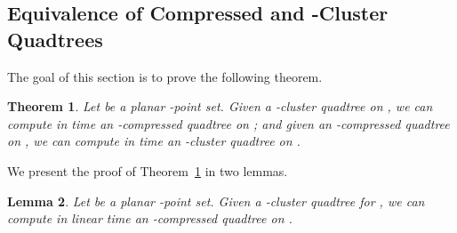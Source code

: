\documentclass[11pt]{paper}
\newtheorem {theorem} {Theorem}[section]
\newtheorem {lem}[theorem] {Lemma}
\begin{document}
\subsection{Equivalence of Compressed and -Cluster Quadtrees}
\label{sec:compressed-c-cluster}

    The goal of this section is to prove the following theorem.
    \begin{theorem}\label{thm:cluster-compressed-equiv}
      Let  be a planar -point set.  Given a
      -cluster quadtree on , we can compute in  time an
      -compressed quadtree on ; and given an -compressed
      quadtree on , we can compute in  time an
      -cluster quadtree on .
    \end{theorem}
   
    We present the proof of Theorem~\ref{thm:cluster-compressed-equiv}
    in two lemmas.

    \begin{lem} \label{lem:c-cluster->compressed}
    Let  be a planar -point set. Given a
    -cluster quadtree  for , we can compute in linear time an
    -compressed quadtree  on .
    \end{lem}
\end{document}
